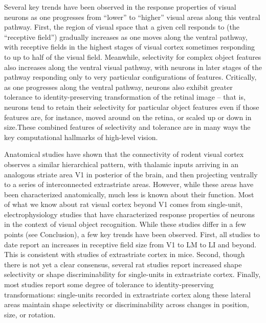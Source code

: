 Several key trends have been observed in the response properties of visual neurons as one progresses from ``lower'' to ``higher'' visual areas along this ventral pathway. First, the region of visual space that a given cell responds to (the ``receptive field'') gradually increases as one moves along the ventral pathway, with receptive fields in the highest stages of visual cortex sometimes responding to up to half of the visual field\cite{OpDeBeeck2001}. Meanwhile, selectivity for complex object features also increases along the ventral visual pathway, with neurons in later stages of the pathway responding only to very particular configurations of features\cite{Desimone1984, Logothetis1996}. Critically, as one progresses along the ventral pathway, neurons also exhibit greater tolerance to identity-preserving transformation of the retinal image -- that is, neurons tend to retain their selectivity for particular object features even if those features are, for instance, moved around on the retina, or scaled up or down in size\cite{Ito1995}.These combined features of selectivity and tolerance are in many ways the key computational hallmarks of high-level vision\cite{DiCarlo2007, DiCarlo2012}. 

Anatomical studies have shown that the connectivity of rodent visual cortex observes a similar hierarchical pattern, with thalamic inputs arriving in an analogous striate area V1 in posterior of the brain, and then projecting ventrally to a series of interconnected extrastriate areas\cite{Coogan1993}. However, while these areas have been characterized anatomically, much less is known about their function. Most of what we know about rat visual cortex beyond V1 comes from single-unit, electrophysiology studies that have characterized response properties of neurons in the context of visual object recognition\cite{Tafazoli2017, Vermaercke2014, Vinken2014}. While these studies differ in a few points (see Conclusion), a few key trends have been observed. First, all studies to date report an increases in receptive field size from V1 to LM to LI and beyond\cite{Tafazoli2017}. This is consistent with studies of extrastriate cortex in mice\cite{Murgas2020, Siegle2021}. Second, though there is not yet a clear consensus, several rat studies report increased shape selectivity or shape discriminability for single-units in extrastriate cortex\cite{Tafazoli2017, Vermaercke2014, Vermaercke2015}. Finally, most studies report some degree of tolerance to identity-preserving transformations: single-units recorded in extrastriate cortex along these lateral areas maintain shape selectivity or discriminability across changes in position, size, or rotation\cite{Vermaercke2014, Tafazoli2017}.


